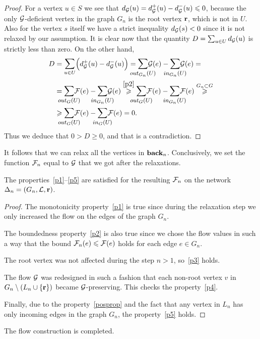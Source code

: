 \documentclass[12pt,oneside,a4paper]{amsart}
\begin{document}
\begin{proof}
          For a vertex $u \in S$ we see that $d_{\cal{G}}(u) = d^{+}_{\cal{G}}(u) - d^{-}_{\cal{G}}(u) \leq 0$,
            because the only $\cal{G}$-deficient vertex in the graph $G_n$ is the root vertex $\root$, which is not in $U$.
          Also for the vertex $s$ itself we have a strict inequality $d_{\cal{G}}(s) < 0$ since it is not relaxed by our assumption.
          It is clear now that the quantity $D = \sum_{u \in U} d_{\cal{G}}(u)$ is strictly less than zero.
          On the other hand,
          \[
            \begin{split}
              D &= \mathlarger\sum_{u \in U} \Big(d^{+}_{\cal{G}}(u) - d^{-}_{\cal{G}}(u)\Big)
              = \mathlarger{\smashoperator{\sum_{\eout_{G_n}(U)}}} \cal{G}(e) - \mathlarger{\smashoperator{\sum_{\ein_{G_n}(U)}}} \cal{G}(e) = \\
              &= \mathlarger{\smashoperator{\sum_{\eout_{G}(U)}}} \flowpos(e) - \mathlarger{\smashoperator{\sum_{\ein_{G_n}(U)}}} \cal{G}(e)
                \overset{\ref{p2}}{\geq} \mathlarger{\smashoperator{\sum_{\eout_G(U)}}} \flowpos(e) - \mathlarger{\smashoperator{\sum_{\ein_{G_n}(U)}}} \flowpos(e) 
                \overset{G_n \subset G} \geq \\
              &\geq \mathlarger{\smashoperator{\sum_{\eout_G(U)}}} \flowpos(e) - \mathlarger{\smashoperator{\sum_{\ein_{G}(U)}}} \flowpos(e) = 0.
            \end{split}
          \]
          Thus we deduce that $0 > D \geq 0$, and that is a contradiction.
        \end{proof}
        It follows that we can relax all the vertices in $\eback_n$.
        Conclusively, we set the function $\flowposn{n}$ equal to $\cal{G}$ that we got after the relaxations.
        \begin{prop}
          The properties~\ref{p1}--\ref{p5} are satisfied for the resulting $\flowposn{n}$ on the network $\net_n = (G_n, \len, \root)$.
        \end{prop}
        \begin{proof}
          The monotonicity property~\ref{p1} is true since during the relaxation step we
            only increased the flow on the edges of the graph $G_n$.

          The boundedness property~\ref{p2} is also true since we chose the flow values in such a way
            that the bound $\flowposn{n}(e) \leq \flowpos(e)$ holds for each edge $e\in G_n$.

          The root vertex was not affected during the step $n > 1$, so~\ref{p3} holds.

          The flow $\cal{G}$ was redesigned in such a fashion that each non-root vertex $v$ in $G_{n} \setminus 
            \left(L_n \cup \{\root\}\right)$ became $\cal{G}$-preserving.
          This checks the property~\ref{p4}.

          Finally, due to the property~\ref{posprop} and the fact that
          any vertex in $L_n$ has only incoming edges in the graph $G_n$, the property~\ref{p5} holds.
        \end{proof}
        The flow construction is completed.
\end{document}
